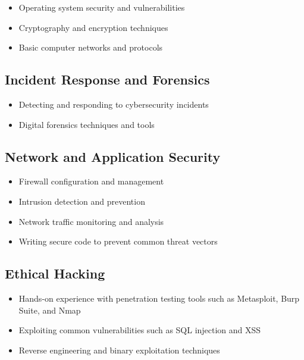 \documentclass[
  letterpaper,
  DIV=11,
  numbers=noendperiod]{scrartcl}
\providecommand{\tightlist}{%
  \setlength{\itemsep}{0pt}\setlength{\parskip}{0pt}}\usepackage{longtable,booktabs,array}
\begin{document}
\begin{itemize}
\tightlist
\item
  Operating system security and vulnerabilities
\item
  Cryptography and encryption techniques
\item
  Basic computer networks and protocols
\end{itemize}

\hypertarget{incident-response-and-forensics}{%
\subsection{Incident Response and
Forensics}\label{incident-response-and-forensics}}

\begin{itemize}
\tightlist
\item
  Detecting and responding to cybersecurity incidents
\item
  Digital forensics techniques and tools
\end{itemize}

\hypertarget{network-and-application-security}{%
\subsection{Network and Application
Security}\label{network-and-application-security}}

\begin{itemize}
\tightlist
\item
  Firewall configuration and management
\item
  Intrusion detection and prevention
\item
  Network traffic monitoring and analysis
\item
  Writing secure code to prevent common threat vectors
\end{itemize}

\hypertarget{ethical-hacking}{%
\subsection{Ethical Hacking}\label{ethical-hacking}}

\begin{itemize}
\tightlist
\item
  Hands-on experience with penetration testing tools such as Metasploit,
  Burp Suite, and Nmap
\item
  Exploiting common vulnerabilities such as SQL injection and XSS
\item
  Reverse engineering and binary exploitation techniques
\end{itemize}
\end{document}
